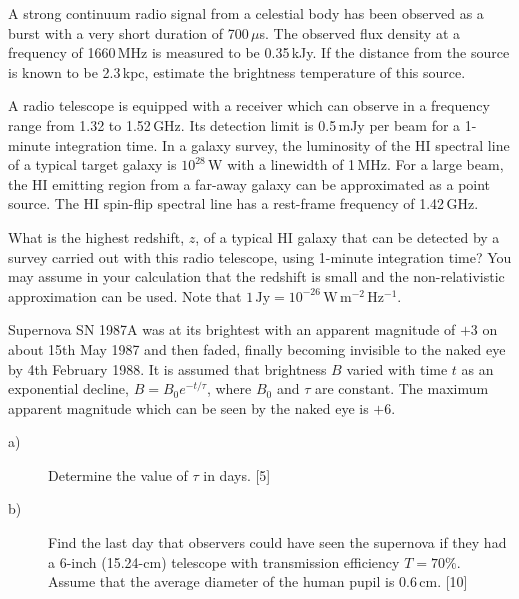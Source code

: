 A strong continuum radio signal from a celestial body has been observed as a
burst with a very short duration of 700\,$\mu$s. The observed flux density at
a frequency of 1660\,MHz is measured to be 0.35\,kJy. If the distance from the
source is known to be 2.3\,kpc, estimate the brightness temperature of this
source.

A radio telescope is equipped with a receiver which can observe in a frequency
range from 1.32 to 1.52\,GHz. Its detection limit is 0.5\,mJy per beam for a
1-minute integration time. In a galaxy survey, the luminosity of the HI
spectral line of a typical target galaxy is $10^{28}$\,W with a linewidth of
1\,MHz. For a large beam, the HI emitting region from a far-away galaxy can be
approximated as a point source. The HI spin-flip spectral line has a
rest-frame frequency of 1.42\,GHz.

What is the highest redshift, $z$, of a typical HI galaxy that can be detected
by a survey carried out with this radio telescope, using 1-minute integration
time? You may assume in your calculation that the redshift is small and the
non-relativistic approximation can be used. Note that
$1\,\mathrm{Jy} = 10^{-26}\,\mathrm{W\,m^{-2}\,Hz^{-1}}$.

Supernova SN 1987A was at its brightest with an apparent magnitude of $+3$ on
about 15th May 1987 and then faded, finally becoming invisible to the naked
eye by 4th February 1988. It is assumed that brightness $B$ varied with time
$t$ as an exponential decline, $B = B_0 e^{-t/\tau}$, where $B_0$ and $\tau$
are constant. The maximum apparent magnitude which can be seen by the naked
eye is $+6$.

\begin{description}
\item[a)] Determine the value of $\tau$ in days. \hfill[5]
\item[b)] Find the last day that observers could have seen the supernova if
  they had a 6-inch (15.24-cm) telescope with transmission efficiency
  $T = 70\%$. Assume that the average diameter of the human pupil is
  0.6\,cm. \hfill[10]
\end{description}

